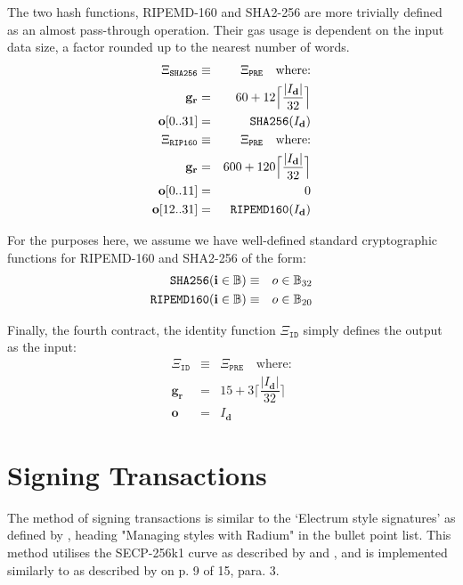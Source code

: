 \documentclass[9pt,oneside]{amsart}
\begin{document}
The two hash functions, RIPEMD-160 and SHA2-256 are more trivially defined as an almost pass-through operation. Their gas usage is dependent on the input data size, a factor rounded up to the nearest number of words.
\begin{eqnarray}
\Xi_{\mathtt{SHA256}} &\equiv& \Xi_{\mathtt{PRE}} \quad \text{where:} \\
\mathbf{g}_\mathbf{r} &=& 60 + 12\Big\lceil \dfrac{|I_\mathbf{d}|}{32} \Big\rceil\\
\mathbf{o}[0..31] &=& \mathtt{\tiny SHA256}(I_\mathbf{d})\\
\Xi_{\mathtt{RIP160}} &\equiv& \Xi_{\mathtt{PRE}} \quad \text{where:} \\
\mathbf{g}_\mathbf{r} &=& 600 + 120\Big\lceil \dfrac{|I_\mathbf{d}|}{32} \Big\rceil\\
\mathbf{o}[0..11] &=& 0 \\
\mathbf{o}[12..31] &=& \mathtt{\tiny RIPEMD160}(I_\mathbf{d})\\
\end{eqnarray}

For the purposes here, we assume we have well-defined standard cryptographic functions for RIPEMD-160 and SHA2-256 of the form:
\begin{eqnarray}
\mathtt{\small SHA256}(\mathbf{i} \in \mathbb{B}) & \equiv & o \in \mathbb{B}_{32} \\
\mathtt{\small RIPEMD160}(\mathbf{i} \in \mathbb{B}) & \equiv & o \in \mathbb{B}_{20}
\end{eqnarray}

Finally, the fourth contract, the identity function $\Xi_{\mathtt{ID}}$ simply defines the output as the input:
\begin{eqnarray}
\Xi_{\mathtt{ID}} &\equiv& \Xi_{\mathtt{PRE}} \quad \text{where:} \\
\mathbf{g}_\mathbf{r} &=& 15 + 3\Big\lceil \dfrac{|I_\mathbf{d}|}{32} \Big\rceil\\
\mathbf{o} &=& I_\mathbf{d}
\end{eqnarray}


\section{Signing Transactions}\label{app:signing}

The method of signing transactions is similar to the `Electrum style signatures' as defined by \cite{npmElectrum2017}, heading "Managing styles with Radium" in the bullet point list. This method utilises the SECP-256k1 curve as described by \cite{secp256k1BitcoinWiki2016} and \cite{secp256k1StackExchange2014}, and is implemented similarly to as described by \cite{gura2004comparing} on p. 9 of 15, para. 3.
\end{document}
